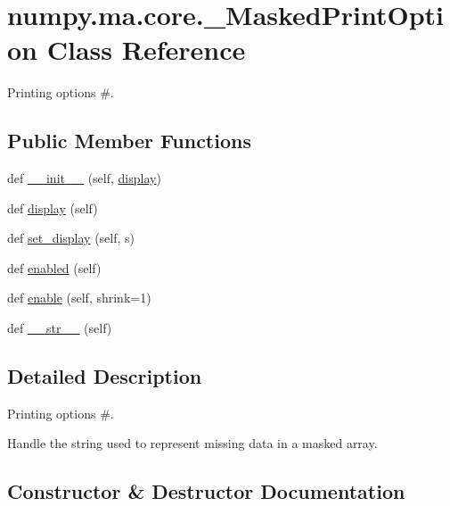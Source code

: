 \hypertarget{classnumpy_1_1ma_1_1core_1_1__MaskedPrintOption}{}\section{numpy.\+ma.\+core.\+\_\+\+Masked\+Print\+Option Class Reference}
\label{classnumpy_1_1ma_1_1core_1_1__MaskedPrintOption}


Printing options \#.  


\subsection*{Public Member Functions}
\begin{DoxyCompactItemize}
\item 
def \hyperlink{classnumpy_1_1ma_1_1core_1_1__MaskedPrintOption_ad3a9a181f21e831569dcc3e91c293263}{\+\_\+\+\_\+init\+\_\+\+\_\+} (self, \hyperlink{classnumpy_1_1ma_1_1core_1_1__MaskedPrintOption_aec2dcb0044d8eae307f6f60b23b9de7a}{display})
\item 
def \hyperlink{classnumpy_1_1ma_1_1core_1_1__MaskedPrintOption_aec2dcb0044d8eae307f6f60b23b9de7a}{display} (self)
\item 
def \hyperlink{classnumpy_1_1ma_1_1core_1_1__MaskedPrintOption_a0813a70835bb064ebc55356dea3f7b47}{set\+\_\+display} (self, s)
\item 
def \hyperlink{classnumpy_1_1ma_1_1core_1_1__MaskedPrintOption_a60c36b4cc32bf9b3715e439c14e93c79}{enabled} (self)
\item 
def \hyperlink{classnumpy_1_1ma_1_1core_1_1__MaskedPrintOption_ad84186501810fa9a0cb43c782eaddd5a}{enable} (self, shrink=1)
\item 
def \hyperlink{classnumpy_1_1ma_1_1core_1_1__MaskedPrintOption_a8cf54f4140e517aa35f909b61ab2b2b0}{\+\_\+\+\_\+str\+\_\+\+\_\+} (self)
\end{DoxyCompactItemize}


\subsection{Detailed Description}
Printing options \#. 

\begin{DoxyVerb}Handle the string used to represent missing data in a masked array.\end{DoxyVerb}
 

\subsection{Constructor \& Destructor Documentation}
\mbox{\label{classnumpy_1_1ma_1_1core_1_1__MaskedPrintOption_ad3a9a181f21e831569dcc3e91c293263}} 
